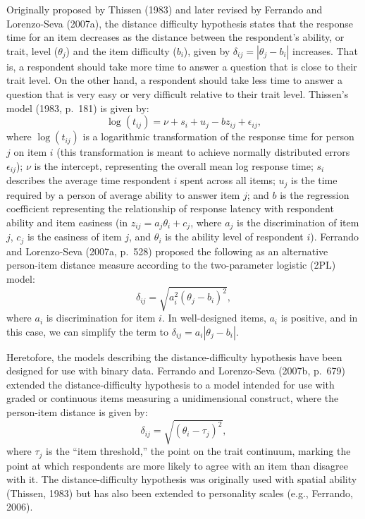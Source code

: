 \documentclass[
  number]{elsarticle}
\begin{document}
Originally proposed by Thissen (1983) and later revised by Ferrando and
Lorenzo-Seva (2007a), the distance difficulty hypothesis states that the
response time for an item decreases as the distance between the
respondent's ability, or trait, level (\(\theta_j\)) and the item
difficulty (\(b_i\)), given by \(\delta_{ij}=|θ_j-b_i|\) increases. That
is, a respondent should take more time to answer a question that is
close to their trait level. On the other hand, a respondent should take
less time to answer a question that is very easy or very difficult
relative to their trait level. Thissen's model (1983, p.~181) is given
by: \[ \log{(t_{ij})} = \nu + s_i+u_j - bz_{ij}+\epsilon_{ij},\] where
\(\log{(t_{ij})}\) is a logarithmic transformation of the response time
for person \(j\) on item \(i\) (this transformation is meant to achieve
normally distributed errors \(\epsilon_{ij}\)); \(\nu\) is the
intercept, representing the overall mean log response time; \(s_i\)
describes the average time respondent \(i\) spent across all items;
\(u_j\) is the time required by a person of average ability to answer
item \(j\); and \(b\) is the regression coefficient representing the
relationship of response latency with respondent ability and item
easiness (in \(z_{ij}=a_j θ_i+c_j\), where \(a_j\) is the discrimination
of item \(j\), \(c_j\) is the easiness of item \(j\), and \(θ_i\) is the
ability level of respondent \(i\)). Ferrando and Lorenzo-Seva (2007a,
p.~528) proposed the following as an alternative person-item distance
measure according to the two-parameter logistic (2PL) model:
\[\delta_{ij}=\sqrt{a_i^2 (θ_j-b_i )^2},\] where \(a_i\) is
discrimination for item \(i\). In well-designed items, \(a_i\) is
positive, and in this case, we can simplify the term to
\(\delta_{ij}=a_i|θ_j-b_i|\).

Heretofore, the models describing the distance-difficulty hypothesis
have been designed for use with binary data. Ferrando and Lorenzo-Seva
(2007b, p.~679) extended the distance-difficulty hypothesis to a model
intended for use with graded or continuous items measuring a
unidimensional construct, where the person-item distance is given by:
\[\delta_{ij}=\sqrt{(θ_i-τ_j)^2},\] where \(\tau_j\) is the ``item
threshold,'' the point on the trait continuum, marking the point at
which respondents are more likely to agree with an item than disagree
with it. The distance-difficulty hypothesis was originally used with
spatial ability (Thissen, 1983) but has also been extended to
personality scales (e.g., Ferrando, 2006).
\end{document}
